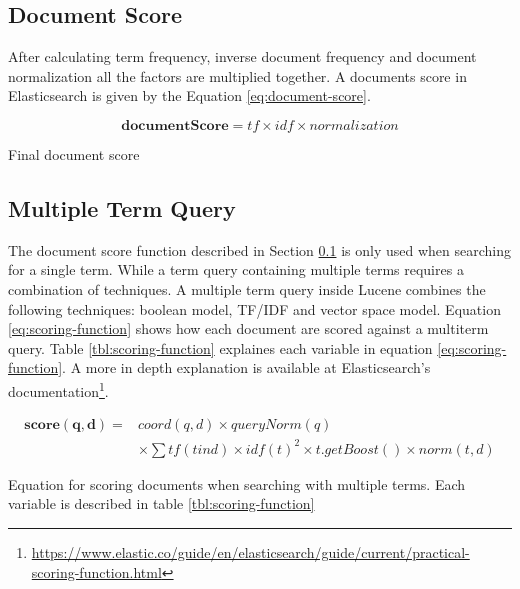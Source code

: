\subsection{Document Score}
\label{sec:doc-score}
After calculating term frequency, inverse document frequency and document normalization all the factors are multiplied together.
A documents score in Elasticsearch is given by the Equation \ref{eq:document-score}.

\begin{cequation}[H]
	\begin{equation}
		\mathbf{documentScore} = tf \times idf \times normalization
	\end{equation}
	\caption{Final document score}
  \label{eq:document-score}
\end{cequation}

\subsection{Multiple Term Query}
The document score function described in Section \ref{sec:doc-score} is only used when searching for a single term.
While a term query containing multiple terms requires a combination of techniques.
A multiple term query inside Lucene combines the following techniques:
boolean model, TF/IDF and vector space model.
Equation \ref{eq:scoring-function} shows how each document are scored against a multiterm query.
Table \ref{tbl:scoring-function} explaines each variable in equation \ref{eq:scoring-function}.
A more in depth explanation is available at Elasticsearch's documentation\footnote{\url{https://www.elastic.co/guide/en/elasticsearch/guide/current/practical-scoring-function.html}}.

\begin{cequation}
	\begin{equation}
		\begin{aligned}
			\mathbf{score(q,d)} = & coord(q,d) \times queryNorm(q) \\
														& \times \sum tf(t in d) \times idf(t)^2 \times t.getBoost() \times norm(t,d)
		\end{aligned}
	\end{equation}
	\caption{Equation for scoring documents when searching with multiple terms. Each variable is described in table \ref{tbl:scoring-function}}
  \label{eq:scoring-function}
\end{cequation}

